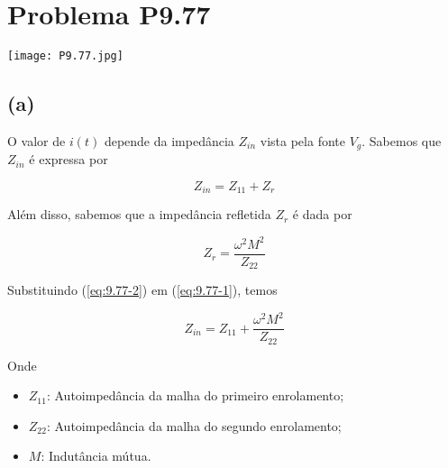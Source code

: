 



% 

\section*{Problema P9.77}

\begin{center}
    \texttt{[image: P9.77.jpg]}
\end{center}

\subsection*{(a)}

O valor de \(i(t)\) depende da impedância \(Z_{in}\) vista pela fonte \(V_{g}\).
Sabemos que \(Z_{in}\) é expressa por

\begin{equation}\label{eq:9.77-1}\tag{9.77-1}
    Z_{in} = Z_{11} + Z_{r}
\end{equation}

Além disso, sabemos que a impedância refletida \(Z_{r}\) é dada por

\begin{equation}\label{eq:9.77-2}\tag{9.77-2}
    Z_{r} = \frac{\omega^2M^2}{Z_{22}}
\end{equation}

Substituindo (\ref{eq:9.77-2}) em (\ref{eq:9.77-1}), temos

\begin{equation}\label{eq:9.77-3}\tag{9.77-3}
    Z_{in} = Z_{11} + \frac{\omega^2M^2}{Z_{22}}
\end{equation}

Onde
\begin{itemize}
    \item \(Z_{11}\): Autoimpedância da malha do primeiro enrolamento;
    \item \(Z_{22}\): Autoimpedância da malha do segundo enrolamento;
    \item \(M\): Indutância mútua.
\end{itemize}

